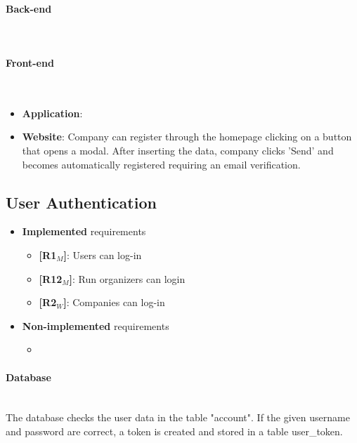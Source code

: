 \paragraph{Back-end} \mbox{}\\ 

\paragraph{Front-end} \mbox{}\\

\begin{itemize}
    \item \textbf{Application}: 
    \item \textbf{Website}: Company can register through the homepage clicking on a button that opens a modal. After inserting the data, company clicks 'Send' and becomes automatically registered requiring an email verification.
\end{itemize}


\subsection{User Authentication}
\begin{itemize}
    \item \textbf{Implemented} requirements
        \begin{itemize}
    \item \textbf{[R1$_M$]}: Users can log-in
    
    \item \textbf{[R12$_M$]}: Run organizers can login
    
    \item \textbf{[R2$_W$]}: Companies can log-in


        \end{itemize}
    \item \textbf{Non-implemented} requirements
    \begin{itemize}
            \item 
        \end{itemize}
\end{itemize}

\paragraph{Database} \mbox{}\\ 
The database checks the user data in the table "account".
If the given username and password are correct, a token is created and stored in a table user\_token. 

